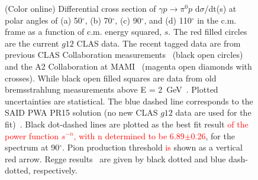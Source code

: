 \documentclass[aps,prc,twocolumn,floatfix,showpacs,preprintnumbers,amsmath,amssymb,superscriptaddress,linenumbers]{revtex4-1}
\begin{document}
\begin{figure}[htb!]
        \caption {(Color online) Differential cross section of 
	$\gamma p\rightarrow\pi^0p$ d$\sigma$/dt(s) at polar angles 
	of (a) 50$^\circ$, (b) 70$^\circ$, 
	(c) 90$^\circ$, and (d) 
	110$^\circ$ in the c.m. frame as a function of c.m. energy 
	squared, $s$. The red filled circles are the current $g12$ 
	CLAS data. The recent tagged data are from previous 
	CLAS Collaboration 
	measurements~\protect\cite{Dugger:2007bt} (black open 
	circles) and the A2 Collaboration at 
	MAMI~\protect\cite{Adlarson:2015byy} 
	(magenta open diamonds with crosses). While black open filled 
	squares are data from old bremsstrahlung measurements above 
	E = 2~GeV~\protect\cite{brem}. Plotted uncertainties are 
	statistical.  
	The blue dashed line corresponds to the SAID PWA 
	PR15 solution (no new CLAS $g12$ data are used 
	for the fit)~\protect\cite{Adlarson:2015byy}.  Black dot-dashed 
	lines are plotted as the best fit result \textcolor{red}{of the power function $s^{-n}$, with n determined to be 6.89$\pm$0.26}, for the spectrum at 
	90$^\circ$. Pion production threshold \textcolor{red}{is} shown as a vertical 
	red arrow. Regge results~\protect\cite{Goldstein:1973xn,
	Laget:2005be} are given by black dotted and blue dash-dotted, 
	respectively.} \label{fig:scaling}
\end{figure}
\end{document}
